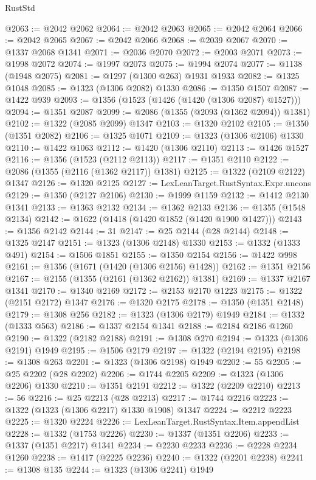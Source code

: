 \begin{lexlean}{RustStd}
\begin{coremodule}
{\begin{coremodule}
{{{{{{{{{{{{{{{{{{{{{{{{{{{{{{{{{{@2063 := @2042 @2062
@2064 := @2042 @2063
@2065 := @2042 @2064
@2066 := @2042 @2065
@2067 := @2042 @2066
@2068 := @2039 @2067
@2070 := @1337 @2068 @1341
@2071 := @2036 @2070
@2072 := @2003 @2071
@2073 := @1998 @2072
@2074 := @1997 @2073
@2075 := @1994 @2074
@2077 := @1138 (@1948 @2075)
@2081 := @1297 (@1300 @263) @1931 @1933
@2082 := @1325 @1048
@2085 := @1323 (@1306 @2082) @1330
@2086 := @1350 @1507
@2087 := @1422 @939
@2093 := @1356 (@1523 (@1426 (@1420 (@1306 @2087) @1527)))
@2094 := @1351 @2087
@2099 := @2086 (@1355 (@2093 (@1362 @2094)) @1381)
@2102 := @1322 (@2085 @2099) @1347
@2103 := @1320 @2102
@2105 := @1350 (@1351 @2082)
@2106 := @1325 @1071
@2109 := @1323 (@1306 @2106) @1330
@2110 := @1422 @1063
@2112 := @1420 (@1306 @2110)
@2113 := @1426 @1527
@2116 := @1356 (@1523 (@2112 @2113))
@2117 := @1351 @2110
@2122 := @2086 (@1355 (@2116 (@1362 @2117)) @1381)
@2125 := @1322 (@2109 @2122) @1347
@2126 := @1320 @2125
@2127 := LexLeanTarget.RustSyntax.Expr.uncons
@2129 := @1350 (@2127 @2106)
@2130 := @1999 @1159
@2132 := @1412 @2130 @1341
@2133 := @1363 @2132
@2134 := @1362 @2133
@2136 := @1355 (@1548 @2134)
@2142 := @1622 (@1418 (@1420 @1852 (@1420 @1900 @1427)))
@2143 := @1356 @2142
@2144 := 31
@2147 := @25 @2144 (@28 @2144)
@2148 := @1325 @2147
@2151 := @1323 (@1306 @2148) @1330
@2153 := @1332 (@1333 @491)
@2154 := @1506 @1851
@2155 := @1350 @2154
@2156 := @1422 @998
@2161 := @1356 (@1671 (@1420 (@1306 @2156) @1428))
@2162 := @1351 @2156
@2167 := @2155 (@1355 (@2161 (@1362 @2162)) @1381)
@2169 := @1337 @2167 @1341
@2170 := @1340 @2169
@2172 := @2153 @2170 @1223
@2175 := @1322 (@2151 @2172) @1347
@2176 := @1320 @2175
@2178 := @1350 (@1351 @2148)
@2179 := @1308 @256
@2182 := @1323 (@1306 @2179) @1949
@2184 := @1332 (@1333 @563)
@2186 := @1337 @2154 @1341
@2188 := @2184 @2186 @1260
@2190 := @1322 (@2182 @2188)
@2191 := @1308 @270
@2194 := @1323 (@1306 @2191) @1949
@2195 := @1506 @2179
@2197 := @1322 (@2194 @2195)
@2198 := @1308 @263
@2201 := @1323 (@1306 @2198) @1949
@2202 := 55
@2205 := @25 @2202 (@28 @2202)
@2206 := @1744 @2205
@2209 := @1323 (@1306 @2206) @1330
@2210 := @1351 @2191
@2212 := @1322 (@2209 @2210)
@2213 := 56
@2216 := @25 @2213 (@28 @2213)
@2217 := @1744 @2216
@2223 := @1322 (@1323 (@1306 @2217) @1330 @1908) @1347
@2224 := @2212 @2223
@2225 := @1320 @2224
@2226 := LexLeanTarget.RustSyntax.Item.appendList
@2228 := @1332 (@1753 @2226)
@2230 := @1337 (@1351 @2206)
@2233 := @1337 (@1351 @2217) @1341
@2234 := @2230 @2233
@2236 := @2228 @2234 @1260
@2238 := @1417 (@2225 @2236)
@2240 := @1322 (@2201 @2238)
@2241 := @1308 @135
@2244 := @1323 (@1306 @2241) @1949
}}}}}}}}}}}}}}}}}}}}}}}}}}}}}}}}}}
\end{coremodule}}
\end{coremodule}
\end{lexlean}
